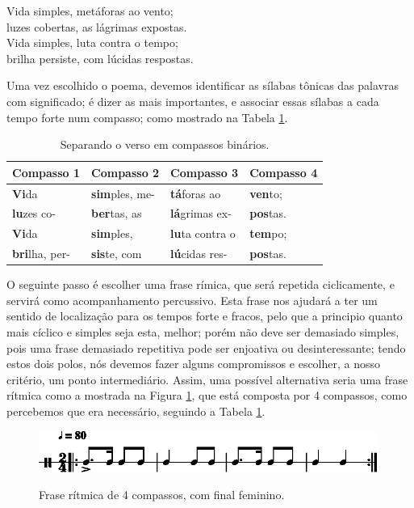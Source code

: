 \begin{citando}
Vida simples, metáforas ao vento;\\
luzes cobertas, as lágrimas expostas.\\
Vida simples, luta contra o tempo;\\
brilha persiste, com lúcidas respostas.
\end{citando}

Uma vez escolhido o poema, 
devemos identificar as sílabas tônicas das palavras com significado;
é dizer as mais importantes, e associar essas sílabas a cada tempo forte num compasso;
como mostrado na Tabela \ref{tab:verso1}.

\begin{table}[h!]
\begin{center}
\begin{tabular}{|l||l||l||l|} %
\hline
Compasso 1 & Compasso 2   & Compasso 3   & Compasso 4 \\ \hline \hline
\textbf{Vi}da       & \textbf{sim}ples, me- & \textbf{tá}foras ao    & \textbf{ven}to;  \\ \hline
\textbf{lu}zes  co- & \textbf{ber}tas, as   & \textbf{lá}grimas ex-  & \textbf{pos}tas. \\ \hline
\textbf{Vi}da       & \textbf{sim}ples, & \textbf{lu}ta contra o & \textbf{tem}po;  \\ \hline
\textbf{bri}lha, per-& \textbf{sis}te, com   & \textbf{lú}cidas res-  & \textbf{pos}tas. \\ \hline
\end{tabular}
\caption{Separando o verso em compassos binários.}
\label{tab:verso1}
\end{center}
\end{table}

O seguinte passo é escolher uma frase rímica, que será repetida ciclicamente,
 e servirá como acompanhamento percussivo.
Esta frase nos ajudará a ter um sentido de localização para os tempos forte e fracos,
pelo que a principio quanto mais cíclico e simples seja esta, melhor;
porém não deve ser demasiado simples, 
pois uma frase demasiado repetitiva pode ser enjoativa ou desinteressante;
tendo estos dois polos, 
nós devemos fazer alguns compromissos e escolher, a nosso critério, um ponto intermediário. 
Assim, uma possível alternativa seria uma frase rítmica como a mostrada na Figura \ref{rap:emocional-protesto1},
que está composta por 4 compassos, como percebemos que era necessário, 
seguindo a Tabela \ref{tab:verso1}.

\begin{figure}[h!]
\centering
    \centering
    \href{https://drive.google.com/file/d/1LFAd73PHwjuau6o3aBQ32EyxmF61UAsg/view?usp=sharing}{\includegraphics[width=0.99\textwidth]{chapters/cap-musicalidade-tecnica/rap-treino-1-1.eps}}
\caption{Frase rítmica de 4 compassos, com final feminino.}
\label{rap:emocional-protesto1}
\end{figure}

